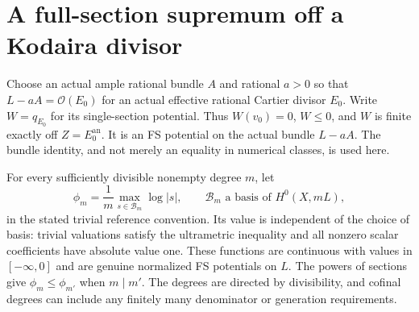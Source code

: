 \documentclass[11pt]{article}
\newcommand{\OO}{\mathcal O}
\newcommand{\an}{\mathrm{an}}
\begin{document}
\section{A full-section supremum off a Kodaira divisor}
Choose an actual ample rational bundle $A$ and rational $a>0$ so that
$L-aA=\OO(E_0)$ for an actual effective rational Cartier divisor $E_0$.
Write $W=q_{E_0}$ for its single-section potential. Thus $W(v_0)=0$,
$W\leq0$, and $W$ is finite exactly off $Z=E_0^\an$. It is an FS
potential on the actual bundle $L-aA$. The bundle identity, and not
merely an equality in numerical classes, is used here.

For every sufficiently divisible nonempty degree $m$, let
\[
 \phi_m=\frac1m\max_{s\in\mathcal B_m}\log|s|,
 \qquad \mathcal B_m\text{ a basis of }H^0(X,mL),
\]
in the stated trivial reference convention. Its value is independent
of the choice of basis: trivial valuations satisfy the ultrametric
inequality and all nonzero scalar coefficients have absolute value one.
These functions are continuous with values in $[-\infty,0]$ and
are genuine normalized FS potentials on $L$. The powers of sections
give $\phi_m\leq\phi_{m'}$ when $m\mid m'$. The degrees are directed
by divisibility, and cofinal degrees can include any finitely many
denominator or generation requirements.
\end{document}
